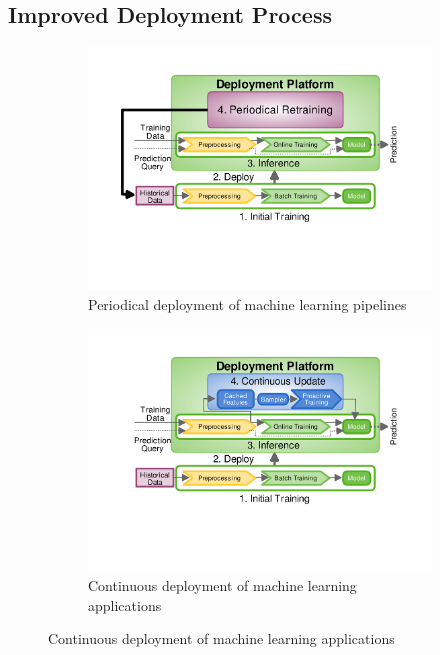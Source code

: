 \subsection{Improved Deployment Process}
\begin{figure}[t]
\begin{subfigure}{\columnwidth}
\centering
\includegraphics[width=\columnwidth]{../images/generic-motivational-example-v2.pdf}
\caption{Periodical deployment of machine learning pipelines}
\label{fig:motivational-example}
\end{subfigure}%
\begin{subfigure}{\columnwidth}
\centering
\includegraphics[width=\columnwidth]{../images/generic-improved-example-v2.pdf}
\caption{Continuous deployment of machine learning applications}
\label{fig:improved-example}
\end{subfigure}
\end{figure}

